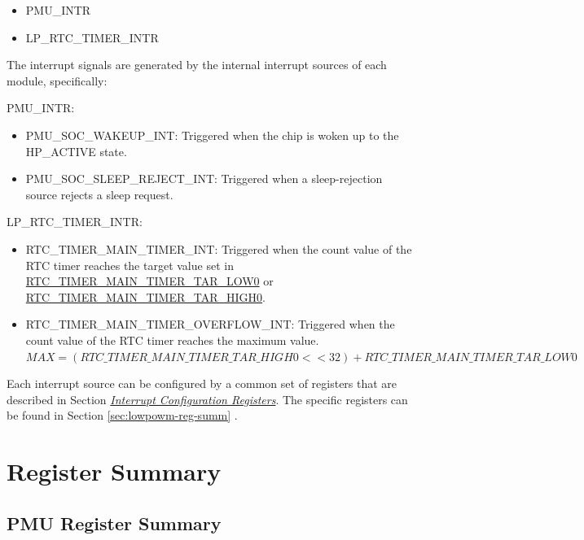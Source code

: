 \documentclass[main\_\_EN.tex]{subfiles}
\begin{document}
\begin{itemize}
    \item PMU\_INTR
    \item LP\_RTC\_TIMER\_INTR
\end{itemize}

The interrupt signals are generated by the internal interrupt sources of each module, specifically:

PMU\_INTR:

\begin{itemize}
\item \label{int:PMUSOCWAKEUPINT}PMU\_SOC\_WAKEUP\_INT: Triggered when the chip is woken up to the HP\_ACTIVE state.
\item \label{int:PMUSOCSLEEPREJECTINT}PMU\_SOC\_SLEEP\_REJECT\_INT: Triggered when a sleep-rejection source rejects a sleep request.
\end{itemize}

LP\_RTC\_TIMER\_INTR:
\begin{itemize}
\item \label{int:RTCTIMERMAINTIMERINT}RTC\_TIMER\_MAIN\_TIMER\_INT: Triggered when the count value of the RTC timer reaches the target value set in \hyperref[fielddesc:RTCTIMERMAINTIMERTARLOW0]{RTC\_TIMER\_MAIN\_TIMER\_TAR\_LOW0} or \hyperref[fielddesc:RTCTIMERMAINTIMERTARHIGH0]{RTC\_TIMER\_MAIN\_TIMER\_TAR\_HIGH0}.
\item \label{int:RTCTIMERMAINTIMEROVERFLOWINT}RTC\_TIMER\_MAIN\_TIMER\_OVERFLOW\_INT: Triggered when the count value of the RTC timer reaches the maximum value.\\
$MAX = (\hyperref[fielddesc:RTCTIMERMAINTIMERTARHIGH0]{RTC\_TIMER\_MAIN\_TIMER\_TAR\_HIGH0} << 32) + \hyperref[fielddesc:RTCTIMERMAINTIMERTARLOW0]{RTC\_TIMER\_MAIN\_TIMER\_TAR\_LOW0}$
\end{itemize}

Each interrupt source can be configured by a common set of registers that are described in Section \hyperref[interrupt-config-registers]{\textit{Interrupt Configuration Registers}}. The specific registers can be found in Section \ref{sec:lowpowm-reg-summ} \textit{}.

\clearpage
\section{Register Summary}\hypertarget{lowpowm-reg-summ}{}\label{sec:lowpowm-reg-summ}

\subsection{PMU Register Summary}
\end{document}
